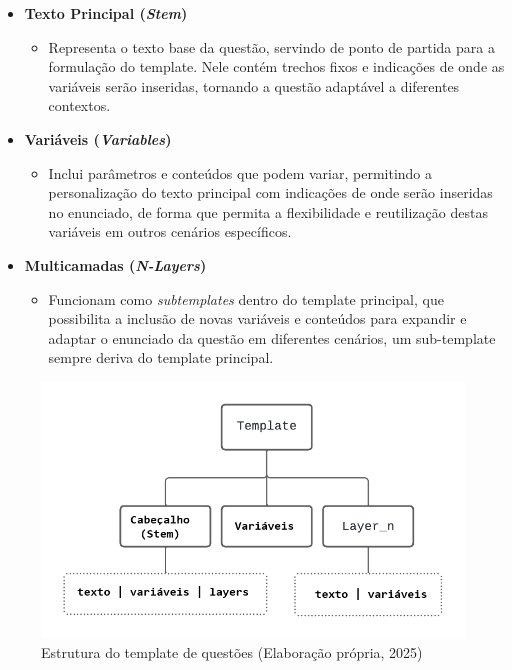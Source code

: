 \begin{itemize} \item \textbf{Texto Principal (\textit{Stem})} \begin{itemize} \item Representa o texto base da questão, servindo de ponto de partida para a formulação do template. Nele contém trechos fixos e indicações de onde as variáveis serão inseridas, tornando a questão adaptável a diferentes contextos. \end{itemize}
\item \textbf{Variáveis (\textit{Variables})}
\begin{itemize}
    \item Inclui parâmetros e conteúdos  que podem variar, permitindo a personalização do texto principal com indicações de onde serão inseridas no enunciado, de forma que permita a flexibilidade e reutilização destas variáveis em outros cenários específicos.
\end{itemize}

\item \textbf{Multicamadas (\textit{N-Layers})}
\begin{itemize}
    \item Funcionam como \textit{subtemplates} dentro do template principal, que possibilita a inclusão de novas variáveis e conteúdos para expandir e adaptar o enunciado da questão em diferentes cenários, um sub-template sempre deriva do template principal.
    \end{itemize}
\end{itemize}


\begin{figure}[ht]
	\centering
	\includegraphics[width=14cm]{./imagens/capitulo5/template-json-example-1}
	\caption{Estrutura do template de questões (Elaboração própria, 2025) }
	\label{fig:template-json-example-1}
\end{figure}


